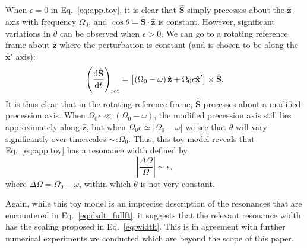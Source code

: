 \documentclass[
        twocolumn,
        twocolappendix
    ]{aastex63}
\newcommand*{\rd}[2]{\frac{\mathrm{d}#1}{\mathrm{d}#2}}
\newcommand*{\abs}[1]{\left|#1\right|}
\renewcommand*{\bm}[1]{\boldsymbol{\mathbf{#1}}}
\newcommand*{\uv}[1]{\hat{\bm{#1}}}
\newcommand*{\p}[1]{\left(#1\right)}
\newcommand*{\s}[1]{\left[#1\right]}
\begin{document}
When $\epsilon = 0$ in Eq.~\eqref{eq:app.toy}, it is clear that $\uv{S}$ simply
precesses about the $\uv{z}$ axis with frequency $\Omega_0$, and $\cos \theta =
\uv{S} \cdot \uv{z}$ is constant. However, significant variations in $\theta$
can be observed when $\epsilon > 0$. We can go to a rotating reference frame
about $\uv{z}$ where the perturbation is constant (and is chosen to be along the
$\uv{x}'$ axis):
\begin{equation}
    \p{\rd{\uv{S}}{t}}_{\rm rot} = \s{\p{\Omega_0 - \omega}\uv{z}
        + \Omega_0 \epsilon \uv{x}'} \times \uv{S}.
\end{equation}
It is thus clear that in the rotating reference frame, $\uv{S}$ precesses about
a modified precession axis. When $\Omega_0 \epsilon \ll \p{\Omega_0 - \omega}$,
the modified precession axis still lies approximately along $\uv{z}$, but when
$\Omega_0 \epsilon \simeq \abs{\Omega_0 - \omega}$ we see that $\theta$ will
vary significantly over timescales $\sim \epsilon \Omega_0$. Thus, this toy
model reveals that Eq.~\eqref{eq:app.toy} has a resonance width defined by
\begin{equation}
    \abs{\frac{\Delta \Omega}{\Omega}} \sim \epsilon,\label{eq:app.width}
\end{equation}
where $\Delta \Omega = \Omega_0 - \omega$, within which $\theta$ is not very
constant.

Again, while this toy model is an imprecise description of the resonances that
are encountered in Eq.~\eqref{eq:dsdt_fullft}, it suggests that the relevant
resonance width has the scaling proposed in Eq.~\eqref{eq:width}. This is in
agreement with further numerical experiments we conducted which are beyond the
scope of this paper.
\end{document}
